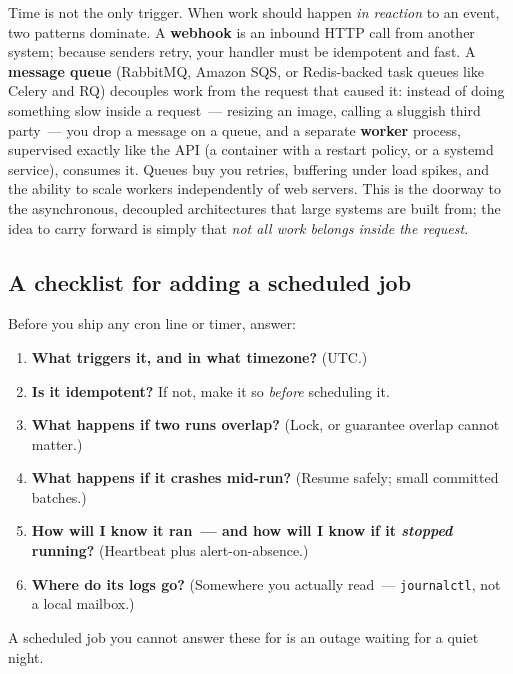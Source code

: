 Time is not the only trigger. When work should happen \emph{in reaction} to an event, two patterns dominate. A \textbf{webhook} is an inbound HTTP call from another system; because senders retry, your handler must be idempotent and fast. A \textbf{message queue} (RabbitMQ, Amazon SQS, or Redis-backed task queues like Celery and RQ) decouples work from the request that caused it: instead of doing something slow inside a request~--- resizing an image, calling a sluggish third party~--- you drop a message on a queue, and a separate \textbf{worker} process, supervised exactly like the API (a container with a restart policy, or a systemd service), consumes it. Queues buy you retries, buffering under load spikes, and the ability to scale workers independently of web servers. This is the doorway to the asynchronous, decoupled architectures that large systems are built from; the idea to carry forward is simply that \emph{not all work belongs inside the request}.

\subsection*{A checklist for adding a scheduled job}\label{25-process-management:a-checklist-for-adding-a-scheduled-job}

Before you ship any cron line or timer, answer:

\begin{enumerate}
\def\labelenumi{\arabic{enumi}.}
\tightlist
\item
  \textbf{What triggers it, and in what timezone?} (UTC.)
\item
  \textbf{Is it idempotent?} If not, make it so \emph{before} scheduling it.
\item
  \textbf{What happens if two runs overlap?} (Lock, or guarantee overlap cannot matter.)
\item
  \textbf{What happens if it crashes mid-run?} (Resume safely; small committed batches.)
\item
  \textbf{How will I know it ran~--- and how will I know if it \emph{stopped} running?} (Heartbeat plus alert-on-absence.)
\item
  \textbf{Where do its logs go?} (Somewhere you actually read~--- \texttt{journalctl}, not a local mailbox.)
\end{enumerate}

\noindent{}A scheduled job you cannot answer these for is an outage waiting for a quiet night.

\setcounter{section}{9}
